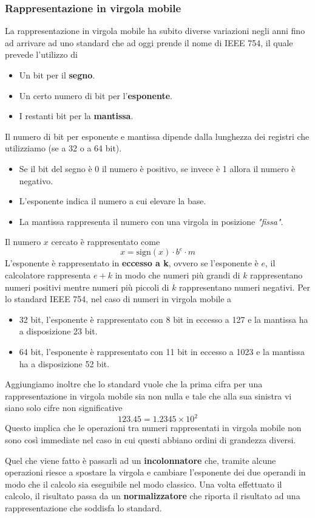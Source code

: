 \subsubsection{Rappresentazione in virgola mobile}
La rappresentazione in virgola mobile ha subito diverse variazioni negli anni fino ad arrivare ad
uno standard che ad oggi prende il nome di IEEE 754, il quale prevede l'utilizzo di
\begin{itemize}
	\item Un bit per il \textbf{segno}.
	\item Un certo numero di bit per l'\textbf{esponente}.
	\item I restanti bit per la \textbf{mantissa}.
\end{itemize}
Il numero di bit per esponente e mantissa dipende dalla lunghezza dei registri che utilizziamo (se
a 32 o a 64 bit).
\begin{itemize}
	\item Se il bit del segno è 0 il numero è positivo, se invece è 1 allora il numero è negativo.
	\item L'esponente indica il numero a cui elevare la base.
	\item La mantissa rappresenta il numero con una virgola in posizione \emph{"fissa"}.
\end{itemize}
Il numero $x$ cercato è rappresentato come
\[ x = \text{sign}(x) \cdot b^e \cdot m \]
L'esponente è rappresentato in \textbf{eccesso a k}, ovvero se l'esponente è $e$, il calcolatore
rappresenta $e+k$ in modo che numeri più grandi di $k$ rappresentano numeri positivi mentre numeri
più piccoli di $k$ rappresentano numeri negativi. Per lo standard IEEE 754, nel caso di numeri in
virgola mobile a
\begin{itemize}
	\item 32 bit, l'esponente è rappresentato con 8 bit in eccesso a 127 e la mantissa ha a
	      disposizione 23 bit.
	\item 64 bit, l'esponente è rappresentato con 11 bit in eccesso a 1023 e la mantissa ha a
	      disposizione 52 bit.
\end{itemize}
Aggiungiamo inoltre che lo standard vuole che la prima cifra per una rappresentazione in virgola
mobile sia non nulla e tale che alla sua sinistra vi siano solo cifre non significative
\[ 123.45 = 1.2345 \times 10^2 \]
Questo implica che le operazioni tra numeri rappresentati in virgola mobile non sono così immediate
nel caso in cui questi abbiano ordini di grandezza diversi.

Quel che viene fatto è passarli ad un \textbf{incolonnatore} che, tramite alcune operazioni riesce
a spostare la virgola e cambiare l'esponente dei due operandi in modo che il calcolo sia eseguibile
nel modo classico. Una volta effettuato il calcolo, il risultato passa da un \textbf{normalizzatore}
che riporta il risultato ad una rappresentazione che soddisfa lo standard.

